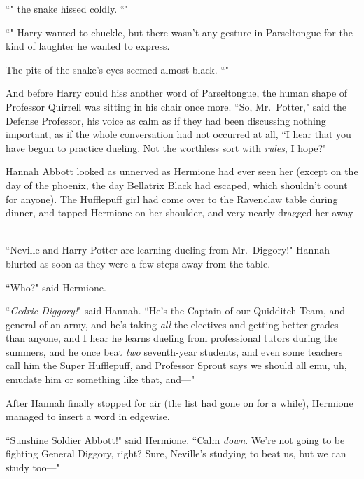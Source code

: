 ``" the snake hissed coldly. ``"

``" Harry wanted to chuckle, but there wasn't any gesture in Parseltongue for the kind of laughter he wanted to express.

The pits of the snake's eyes seemed almost black. ``"

And before Harry could hiss another word of Parseltongue, the human shape of Professor Quirrell was sitting in his chair once more. ``So, Mr.~Potter," said the Defense Professor, his voice as calm as if they had been discussing nothing important, as if the whole conversation had not occurred at all, ``I hear that you have begun to practice dueling. Not the worthless sort with \emph{rules}, I hope?"

\later

Hannah Abbott looked as unnerved as Hermione had ever seen her (except on the day of the phoenix, the day Bellatrix Black had escaped, which shouldn't count for anyone). The Hufflepuff girl had come over to the Ravenclaw table during dinner, and tapped Hermione on her shoulder, and very nearly dragged her away---

``Neville and Harry Potter are learning dueling from Mr.~Diggory!" Hannah blurted as soon as they were a few steps away from the table.

``Who?" said Hermione.

``\emph{Cedric Diggory!}" said Hannah. ``He's the Captain of our Quidditch Team, and general of an army, and he's taking \emph{all} the electives and getting better grades than anyone, and I hear he learns dueling from professional tutors during the summers, and he once beat \emph{two} seventh-year students, and even some teachers call him the Super Hufflepuff, and Professor Sprout says we should all emu, uh, emudate him or something like that, and---"

After Hannah finally stopped for air (the list had gone on for a while), Hermione managed to insert a word in edgewise.

``Sunshine Soldier Abbott!" said Hermione. ``Calm \emph{down}. We're not going to be fighting General Diggory, right? Sure, Neville's studying to beat us, but we can study too---"

